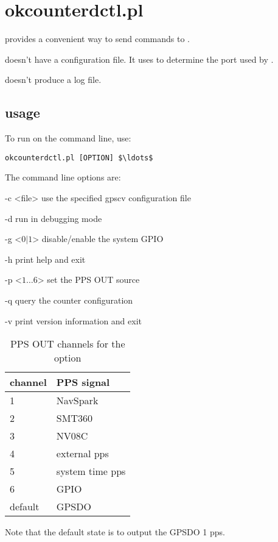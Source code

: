 \section{okcounterdctl.pl \label{s:okcounterdctl}}

 provides a convenient way to send commands to .

 doesn't have a configuration file. It uses
 to determine the port used by .

 doesn't produce a log file.

\subsection{usage}

To run  on the command line, use:
\begin{lstlisting}[mathescape=true]
okcounterdctl.pl [OPTION] $\ldots$
\end{lstlisting}
The command line options are:
\begin{description*}
	\item[-c \textless file\textgreater] use the specified gpscv configuration file
	\item[-d]	run in debugging mode
	\item[-g \textless $0|1$\textgreater] disable/enable the system GPIO
	\item[-h]	print help and exit
	\item[-p \textless $1\ldots6$\textgreater] set the PPS OUT source
	\item[-q] query the counter configuration
	\item[-v]	print version information and exit
\end{description*}

\begin{centering}
\begin{table}[h]
\begin{tabular}{ll}
channel & PPS signal \\ \hline
1 & NavSpark\\
2 & SMT360\\
3 & NV08C\\
4 & external pps\\
5 & system time pps\\
6 & GPIO\\
default & GPSDO
\end{tabular}
\caption{PPS OUT channels for the  option}
\end{table}
\end{centering}

Note that the default state is to output the GPSDO 1 pps.


